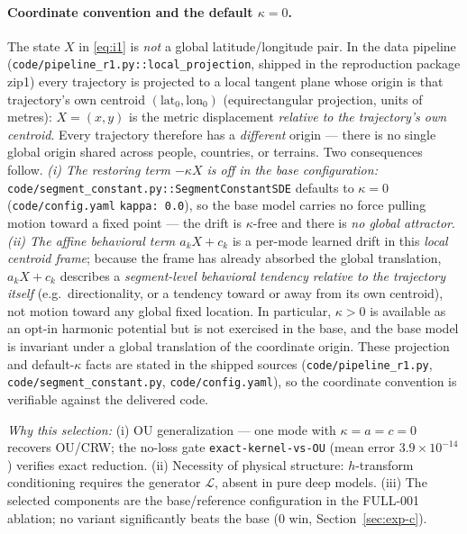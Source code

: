 \documentclass[11pt]{article}
\begin{document}
\paragraph{Coordinate convention and the default $\kappa=0$.}
The state $X$ in \eqref{eq:i1} is \emph{not} a global latitude/longitude pair.
In the data pipeline (\texttt{code/pipeline\_r1.py::local\_projection}, shipped in
the reproduction package zip1) every trajectory is projected to a local tangent
plane whose origin is that trajectory's own centroid $(\mathrm{lat}_0,\mathrm{lon}_0)$
(equirectangular projection, units of metres): $X=(x,y)$ is the metric displacement
\emph{relative to the trajectory's own centroid}. Every trajectory therefore has a
\emph{different} origin --- there is no single global origin shared across people,
countries, or terrains. Two consequences follow. \emph{(i) The restoring term
$-\kappa X$ is off in the base configuration:} \texttt{code/segment\_constant.py::SegmentConstantSDE}
defaults to $\kappa=0$ (\texttt{code/config.yaml} \texttt{kappa: 0.0}), so the base
model carries no force pulling motion toward a fixed point --- the drift is
$\kappa$-free and there is \emph{no global attractor}. \emph{(ii) The affine
behavioral term $a_k X + c_k$} is a per-mode learned drift in this \emph{local
centroid frame}; because the frame has already absorbed the global translation,
$a_k X + c_k$ describes a \emph{segment-level behavioral tendency relative to the
trajectory itself} (e.g.\ directionality, or a tendency toward or away from its own
centroid), not motion toward any global fixed location. In particular, $\kappa>0$ is
available as an opt-in harmonic potential but is not exercised in the base, and the
base model is invariant under a global translation of the coordinate origin. These
projection and default-$\kappa$ facts are stated in the shipped sources
(\texttt{code/pipeline\_r1.py}, \texttt{code/segment\_constant.py},
\texttt{code/config.yaml}), so the coordinate convention is verifiable against the
delivered code.

\emph{Why this selection:} (i) OU generalization --- one mode with
$\kappa=a=c=0$ recovers OU/CRW; the no-loss gate \texttt{exact-kernel-vs-OU} (mean error
$3.9\times10^{-14}$) verifies exact reduction. (ii) Necessity of physical structure:
$h$-transform conditioning requires the generator $\mathcal{L}$, absent in pure deep
models. (iii) The selected components are the base/reference configuration in the FULL-001
ablation; no variant significantly beats the base (0 win, Section~\ref{sec:exp-c}).
\end{document}
